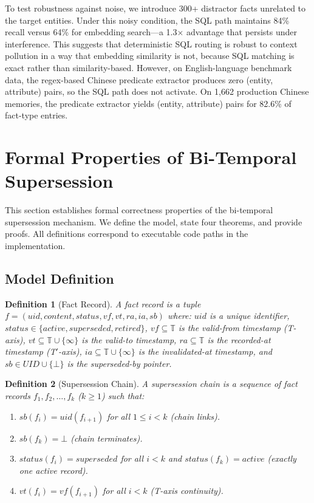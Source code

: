 \documentclass{article}
\newtheorem{definition}{Definition}
\begin{document}
To test robustness against noise, we introduce 300+ distractor facts unrelated to the target entities. Under this noisy condition, the SQL path maintains 84\% recall versus 64\% for embedding search---a 1.3$\times$ advantage that persists under interference. This suggests that deterministic SQL routing is robust to context pollution in a way that embedding similarity is not, because SQL matching is exact rather than similarity-based. However, on English-language benchmark data, the regex-based Chinese predicate extractor produces zero (entity, attribute) pairs, so the SQL path does not activate. On 1{,}662 production Chinese memories, the predicate extractor yields (entity, attribute) pairs for 82.6\% of fact-type entries.


\section{Formal Properties of Bi-Temporal Supersession}
\label{sec:formal}

This section establishes formal correctness properties of the bi-temporal supersession mechanism. We define the model, state four theorems, and provide proofs. All definitions correspond to executable code paths in the implementation.

\subsection{Model Definition}

\begin{definition}[Fact Record]
A \emph{fact record} is a tuple $f = (\mathit{uid}, \mathit{content}, \mathit{status}, \mathit{vf}, \mathit{vt}, \mathit{ra}, \mathit{ia}, \mathit{sb})$ where:
$\mathit{uid}$ is a unique identifier, $\mathit{status} \in \{\mathit{active}, \mathit{superseded}, \mathit{retired}\}$, $\mathit{vf} \subseteq \mathbb{T}$ is the \emph{valid-from} timestamp (T-axis), $\mathit{vt} \subseteq \mathbb{T} \cup \{\infty\}$ is the \emph{valid-to} timestamp, $\mathit{ra} \subseteq \mathbb{T}$ is the \emph{recorded-at} timestamp (T$'$-axis), $\mathit{ia} \subseteq \mathbb{T} \cup \{\infty\}$ is the \emph{invalidated-at} timestamp, and $\mathit{sb} \in \mathit{UID} \cup \{\bot\}$ is the \emph{superseded-by} pointer.
\end{definition}

\begin{definition}[Supersession Chain]
A \emph{supersession chain} is a sequence of fact records $f_1, f_2, \ldots, f_k$ ($k \geq 1$) such that:
\begin{enumerate}
\item $\mathit{sb}(f_i) = \mathit{uid}(f_{i+1})$ for all $1 \leq i < k$ (chain links).
\item $\mathit{sb}(f_k) = \bot$ (chain terminates).
\item $\mathit{status}(f_i) = \mathit{superseded}$ for all $i < k$ and $\mathit{status}(f_k) = \mathit{active}$ (exactly one active record).
\item $\mathit{vt}(f_i) = \mathit{vf}(f_{i+1})$ for all $i < k$ (T-axis continuity).
\end{enumerate}
\end{definition}
\end{document}
